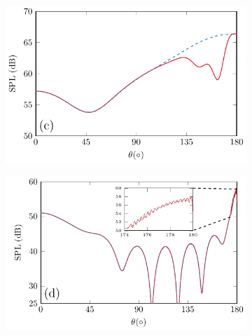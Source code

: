 \begin{figure}[!htb]
\begin{subfigure}{0.49\textwidth}
        \centering
        \includegraphics[width = \textwidth]{fig/PalSphereAudio_211205D_TestTheta1D_Compare_r10cm_1000Hz_211206C.pdf}
    \end{subfigure}
    \begin{subfigure}{0.49\textwidth}
        \centering
        \includegraphics[width = \textwidth]{fig/PalSphereAudio_211205D_TestTheta1D_Compare_r100cm_1000Hz_211206E.pdf}
    \end{subfigure}
    \\
    \begin{subfigure}{0.49\textwidth}
        \centering

\end{subfigure}
\end{figure}
